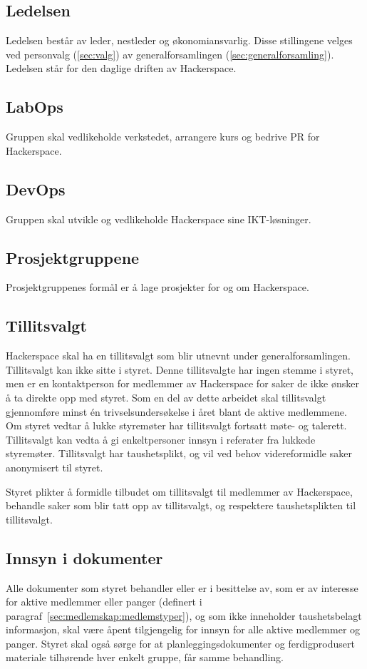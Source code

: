 \subsection{Ledelsen}\label{sec:struktur:ledelsen}
Ledelsen består av leder, nestleder og økonomiansvarlig.
Disse stillingene velges ved personvalg (\ref{sec:valg}) av generalforsamlingen (\ref{sec:generalforsamling}).
Ledelsen står for den daglige driften av Hackerspace.

\subsection{LabOps}\label{sec:struktur:labops}
Gruppen skal vedlikeholde verkstedet, arrangere kurs og bedrive PR for Hackerspace.

\subsection{DevOps}\label{sec:struktur:devops}
Gruppen skal utvikle og vedlikeholde Hackerspace sine IKT-løsninger.

\subsection{Prosjektgruppene}\label{sec:struktur:prosjektgruppene}
Prosjektgruppenes formål er å lage prosjekter for og om Hackerspace.

\subsection{Tillitsvalgt}\label{sec:struktur:tillitsvalgt}
Hackerspace skal ha en tillitsvalgt som blir utnevnt under generalforsamlingen. Tillitsvalgt kan ikke sitte i styret.
Denne tillitsvalgte har ingen stemme i styret, men er en kontaktperson for medlemmer av Hackerspace for saker de ikke ønsker å ta direkte opp med styret.
Som en del av dette arbeidet skal tillitsvalgt gjennomføre minst én trivselsundersøkelse i året blant de aktive medlemmene.
Om styret vedtar å lukke styremøter har tillitsvalgt fortsatt møte- og talerett.
Tillitsvalgt kan vedta å gi enkeltpersoner innsyn i referater fra lukkede styremøter.
Tillitsvalgt har taushetsplikt, og vil ved behov videreformidle saker anonymisert til styret.

Styret plikter å formidle tilbudet om tillitsvalgt til medlemmer av Hackerspace, behandle saker som blir tatt opp av tillitsvalgt, og respektere taushetsplikten til tillitsvalgt.

\subsection{Innsyn i dokumenter}\label{sec:struktur:innsyn}
Alle dokumenter som styret behandler eller er i besittelse av, som er av interesse for aktive medlemmer eller panger (definert i paragraf~\ref{sec:medlemskap:medlemstyper}), og som ikke inneholder taushetsbelagt informasjon, skal være åpent tilgjengelig for innsyn for alle aktive medlemmer og panger.
Styret skal også sørge for at planleggingsdokumenter og ferdigprodusert materiale tilhørende hver enkelt gruppe, får samme behandling.


